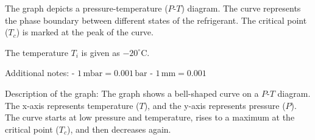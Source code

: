 The graph depicts a pressure-temperature (\(P\)-\(T\)) diagram. The curve represents the phase boundary between different states of the refrigerant. The critical point (\(T_c\)) is marked at the peak of the curve.  

The temperature \(T_i\) is given as \(-20^\circ\text{C}\).  

Additional notes:  
- \(1 \, \text{mbar} = 0.001 \, \text{bar}\)  
- \(1 \, \text{mm} = 0.001\)  

Description of the graph:  
The graph shows a bell-shaped curve on a \(P\)-\(T\) diagram. The x-axis represents temperature (\(T\)), and the y-axis represents pressure (\(P\)). The curve starts at low pressure and temperature, rises to a maximum at the critical point (\(T_c\)), and then decreases again.